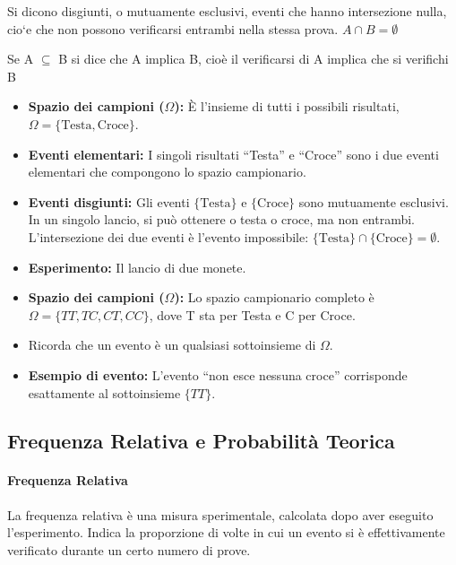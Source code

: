 Si dicono disgiunti, o mutuamente esclusivi, eventi che hanno intersezione nulla, cio`e che
non possono verificarsi entrambi nella stessa prova. $A \cap B = \emptyset$

Se A $\subseteq$ B si dice che A implica B, cioè il verificarsi di A implica che
si verifichi B

\begin{esempio}
    \begin{itemize}
        \item \textbf{Spazio dei campioni ($\Omega$):} È l'insieme di tutti i possibili risultati, $\Omega = \{ \text{Testa}, \text{Croce} \}$.
        \item \textbf{Eventi elementari:} I singoli risultati ``Testa'' e ``Croce'' sono i due eventi elementari che compongono lo spazio campionario.
        \item \textbf{Eventi disgiunti:} Gli eventi $\{ \text{Testa} \}$ e $\{ \text{Croce} \}$ sono mutuamente esclusivi. In un singolo lancio, si può ottenere o testa o croce, ma non entrambi. L'intersezione dei due eventi è l'evento impossibile: $\{ \text{Testa} \} \cap \{ \text{Croce} \} = \emptyset$.
    \end{itemize}
\end{esempio}

\begin{esempio}
    \begin{itemize}
        \item \textbf{Esperimento:} Il lancio di due monete.
        \item \textbf{Spazio dei campioni ($\Omega$):} Lo spazio campionario completo è $\Omega = \{TT, TC, CT, CC\}$, dove T sta per Testa e C per Croce.
        \item Ricorda che un evento è un qualsiasi sottoinsieme di $\Omega$.
        \item \textbf{Esempio di evento:} L'evento ``non esce nessuna croce'' corrisponde esattamente al sottoinsieme $\{TT\}$.
    \end{itemize}
\end{esempio}

\subsection{Frequenza Relativa e Probabilità Teorica}

\paragraph{Frequenza Relativa}
La frequenza relativa è una misura sperimentale, calcolata dopo aver eseguito l’esperimento. Indica la proporzione di volte in cui un evento si è effettivamente verificato durante un certo numero di prove.

